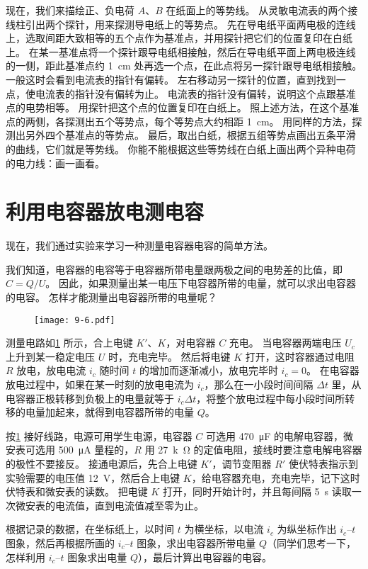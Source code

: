 现在，我们来描绘正、负电荷 $A$、$B$ 在纸面上的等势线。
从灵敏电流表的两个接线柱引出两个探针，用来探测导电纸上的等势点。
先在导电纸平面两电极的连线上，选取间距大致相等的五个点作为基准点，并用探针把它们的位置复印在白纸上。
在某一基准点将一个探针跟导电纸相接触，然后在导电纸平面上两电极连线的一侧，距此基准点约 \qty{1}{cm} 处再选一个点，在此点将另一探针跟导电纸相接触。
一般这时会看到电流表的指针有偏转。
左右移动另一探针的位置，直到找到一点，使电流表的指针没有偏转为止。
电流表的指针没有偏转，说明这个点跟基准点的电势相等。
用探针把这个点的位置复印在白纸上。
照上述方法，在这个基准点的两侧，各探测出五个等势点，每个等势点大约相距 \qty{1}{cm}。
用同样的方法，探测出另外四个基准点的等势点。
最后，取出白纸，根据五组等势点画出五条平滑的曲线，它们就是等势线。
你能不能根据这些等势线在白纸上画出两个异种电荷的电力线：画一画看。

\section{利用电容器放电测电容}
现在，我们通过实验来学习一种测量电容器电容的简单方法。

我们知道，电容器的电容等于电容器所带电量跟两极之间的电势差的比值，即 $C=Q/U$。
因此，如果测量出某一电压下电容器所带的电量，就可以求出电容器的电容。
怎样才能测量出电容器所带的电量呢？
\begin{figure}
  \texttt{[image: 9-6.pdf]}    
  \caption{}\label{fig:9-6}
\end{figure}

测量电路如\cref{fig:9-6} 所示，合上电键 $K'$、$K$，对电容器 $C$ 充电。
当电容器两端电压 $U_c$ 上升到某一稳定电压 $U$ 时，充电完毕。
然后将电键 $K$ 打开，这时容器通过电阻 $R$ 放电，放电电流 $i_c$ 随时间 $t$ 的增加而逐渐减小，放电完毕时 $i_c=0$。
在电容器放电过程中，如果在某一时刻的放电电流为 $i_c$，那么在一小段时间间隔 $\Delta t$ 里，从电容器正极转移到负极上的电量就等于 $i_c\Delta t$，将整个放电过程中每小段时间所转移的电量加起来，就得到电容器所带的电量 $Q$。

按\cref{fig:9-6} 接好线路，电源可用学生电源，电容器 $C$ 可选用 \qty{470}{\micro F} 的电解电容器，微安表可选用 \qty{500}{\micro A} 量程的，$R$ 用 \qty{27}{k\ohm} 的定值电阻，接线时要注意电解电容器的极性不要接反。
接通电源后，先合上电键 $K'$，调节变阻器 $R'$ 使伏特表指示到实验需要的电压值 \qty{12}{V}，然后合上电键 $K$，给电容器充电，充电完毕，记下这时伏特表和微安表的读数。
把电键 $K$ 打开，同时开始计时，并且每间隔 \qty{5}{s} 读取一次微安表的电流值，直到电流值减至零为止。

根据记录的数据，在坐标纸上，以时间 $t$ 为横坐标，以电流 $i_c$ 为纵坐标作出 $i_c$--$t$ 图象，然后再根据所画的 $i_c$--$t$ 图象，求出电容器所带电量 $Q$（同学们思考一下，怎样利用 $i_c$--$t$ 图象求出电量 $Q$），最后计算出电容器的电容。

